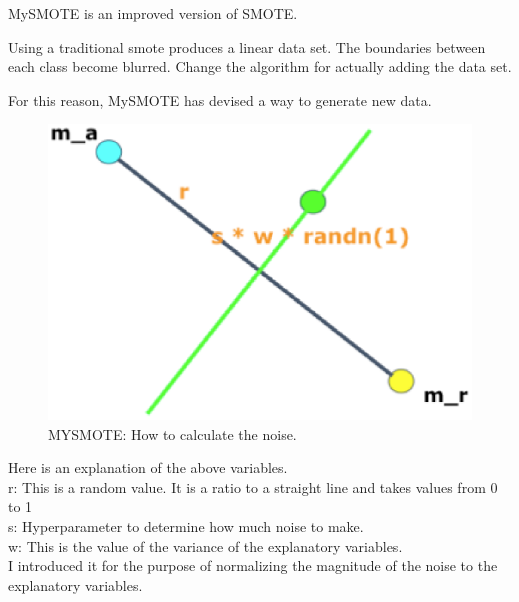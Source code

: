 MySMOTE is an improved version of SMOTE.

Using a traditional smote produces a linear data set.
The boundaries between each class become blurred.
Change the algorithm for actually adding the data set.

For this reason, MySMOTE has devised a way to generate new data.

\begin{center}
    \begin{figure}[ht]
        \caption{MYSMOTE: How to calculate the noise.}
        \label{tab:team-rating-features}
        \begin{center}
            \includegraphics[scale=0.6]{image/mysmote1.eps}
        \end{center}
    \end{figure}
\end{center}

Here is an explanation of the above variables.\\
r: This is a random value.
It is a ratio to a straight line and takes values from 0 to 1\\
s: Hyperparameter to determine how much noise to make.\\
w: This is the value of the variance of the explanatory variables.\\
I introduced it for the purpose of normalizing the magnitude of the noise to the explanatory variables.

